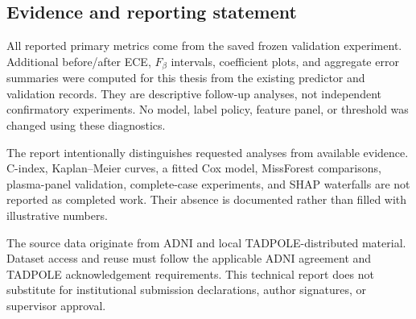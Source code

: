 \documentclass[11pt,a4paper]{article}
\begin{document}
\subsection*{Evidence and reporting statement}
All reported primary metrics come from the saved frozen validation experiment. Additional before/after ECE, $F_\beta$ intervals, coefficient plots, and aggregate error summaries were computed for this thesis from the existing predictor and validation records. They are descriptive follow-up analyses, not independent confirmatory experiments. No model, label policy, feature panel, or threshold was changed using these diagnostics.

The report intentionally distinguishes requested analyses from available evidence. C-index, Kaplan--Meier curves, a fitted Cox model, MissForest comparisons, plasma-panel validation, complete-case experiments, and SHAP waterfalls are not reported as completed work. Their absence is documented rather than filled with illustrative numbers.

The source data originate from ADNI and local TADPOLE-distributed material. Dataset access and reuse must follow the applicable ADNI agreement and TADPOLE acknowledgement requirements. This technical report does not substitute for institutional submission declarations, author signatures, or supervisor approval.

\clearpage
\end{document}
